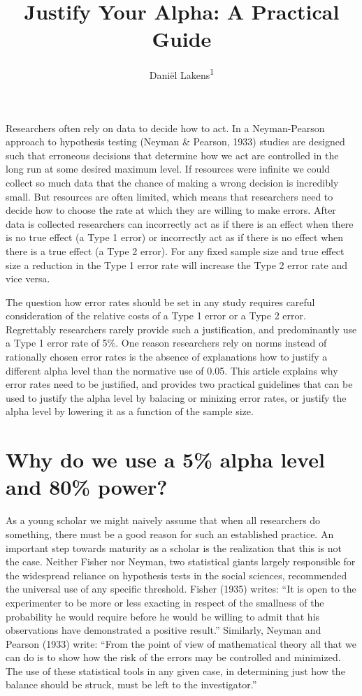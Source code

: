 \documentclass[,jou,floatsintext]{apa6}
\title{Justify Your Alpha: A Practical Guide}
\author{Daniël Lakens\textsuperscript{1}}
\date{}
\affiliation{
\vspace{0.5cm}
\textsuperscript{1} Eindhoven University of Technology, The Netherlands}
\begin{document}
\maketitle

Researchers often rely on data to decide how to act. In a Neyman-Pearson approach to hypothesis testing (Neyman \& Pearson, 1933) studies are designed such that erroneous decisions that determine how we act are controlled in the long run at some desired maximum level. If resources were infinite we could collect so much data that the chance of making a wrong decision is incredibly small. But resources are often limited, which means that researchers need to decide how to choose the rate at which they are willing to make errors. After data is collected researchers can incorrectly act as if there is an effect when there is no true effect (a Type 1 error) or incorrectly act as if there is no effect when there is a true effect (a Type 2 error). For any fixed sample size and true effect size a reduction in the Type 1 error rate will increase the Type 2 error rate and vice versa.

The question how error rates should be set in any study requires careful consideration of the relative costs of a Type 1 error or a Type 2 error. Regrettably researchers rarely provide such a justification, and predominantly use a Type 1 error rate of 5\%. One reason researchers rely on norms instead of rationally chosen error rates is the absence of explanations how to justify a different alpha level than the normative use of 0.05. This article explains why error rates need to be justified, and provides two practical guidelines that can be used to justify the alpha level by balacing or minizing error rates, or justify the alpha level by lowering it as a function of the sample size.

\hypertarget{why-do-we-use-a-5-alpha-level-and-80-power}{%
\section{Why do we use a 5\% alpha level and 80\% power?}\label{why-do-we-use-a-5-alpha-level-and-80-power}}

As a young scholar we might naively assume that when all researchers do something, there must be a good reason for such an established practice. An important step towards maturity as a scholar is the realization that this is not the case. Neither Fisher nor Neyman, two statistical giants largely responsible for the widespread reliance on hypothesis tests in the social sciences, recommended the universal use of any specific threshold. Fisher (1935) writes: \enquote{It is open to the experimenter to be more or less exacting in respect of the smallness of the probability he would require before he would be willing to admit that his observations have demonstrated a positive result.} Similarly, Neyman and Pearson (1933) write: \enquote{From the point of view of mathematical theory all that we can do is to show how the risk of the errors may be controlled and minimized. The use of these statistical tools in any given case, in determining just how the balance should be struck, must be left to the investigator.}
\end{document}
